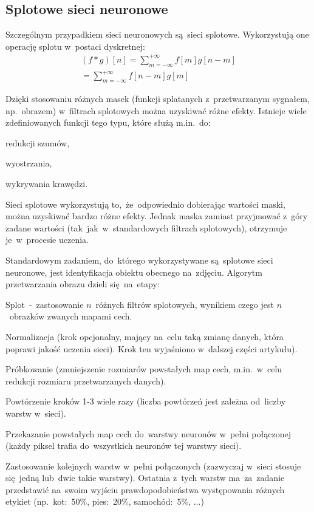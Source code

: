 \documentclass[oneside, 11pt, a4paper]{article}
\begin{document}
\begin{multicols}{2}
\section{Splotowe sieci neuronowe}
Szczególnym przypadkiem sieci neuronowych są~sieci splotowe. Wykorzystują one operację splotu w~postaci dyskretnej:
\begin{align*}
(f \ast g)[n] = \sum\limits_{m=-\infty}^{+\infty}f[m]g[n-m]\\
=\sum\limits_{m=-\infty}^{+\infty}f[n-m]g[m]
\end{align*}

Dzięki stosowaniu różnych masek (funkcji splatanych z~przetwarzanym sygnałem, np.~obrazem) w~filtrach splotowych można uzyskiwać różne efekty. Istnieje wiele zdefiniowanych funkcji tego typu, które służą m.in.~do:
\begin{compactitem}
	\item redukcji szumów,
	\item wyostrzania,
	\item wykrywania krawędzi.
\end{compactitem}

Sieci splotowe wykorzystują to,~że~odpowiednio dobierając wartości maski, można uzyskiwać bardzo różne efekty. Jednak maska zamiast przyjmować z~góry zadane wartości (tak~jak~w~standardowych filtrach splotowych), otrzymuje je~w~procesie uczenia.

Standardowym zadaniem, do~którego wykorzystywane są~splotowe sieci neuronowe, jest identyfikacja obiektu obecnego na~zdjęciu. Algorytm przetwarzania obrazu dzieli się~na~etapy:
\begin{compactenum}
	\item Splot~-~zastosowanie $n$~różnych filtrów splotowych, wynikiem czego jest $n$~obrazków zwanych mapami cech.
	\item Normalizacja (krok opcjonalny, mający na~celu taką zmianę danych, która poprawi jakość uczenia sieci). Krok ten wyjaśniono w~dalszej części artykułu).
	\item Próbkowanie (zmniejszenie rozmiarów powstałych map cech, m.in.~w~celu redukcji rozmiaru przetwarzanych danych).
	\item Powtórzenie kroków 1-3 wiele razy (liczba powtórzeń jest zależna od~liczby warstw w~sieci).
	\item Przekazanie powstałych map cech do~warstwy neuronów w~pełni połączonej (każdy piksel trafia do~wszystkich neuronów tej warstwy sieci).
	\item Zastosowanie kolejnych warstw w~pełni połączonych (zazwyczaj w~sieci stosuje się~jedną lub~dwie takie warstwy).
	Ostatnia z~tych warstw ma~za~zadanie przedstawić na~swoim wyjściu prawdopodobieństwa występowania różnych etykiet (np.~kot:~50\%, pies:~20\%, samochód:~5\%, ...)
\end{compactenum}


\end{multicols}
\end{document}
